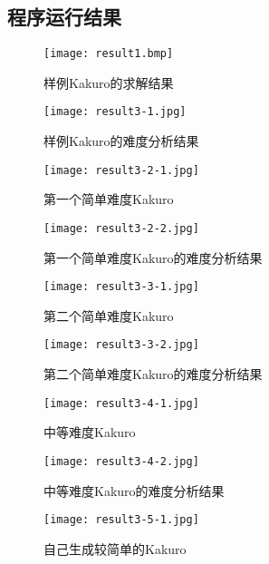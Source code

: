     \subsection*{程序运行结果}
        \begin{figure}[htb]
            \centering
            \texttt{[image: result1.bmp]}
            \caption[结果1]{样例Kakuro的求解结果}\label{resKak}
        \end{figure}
        \begin{figure}[htb]
            \centering
            \texttt{[image: result3-1.jpg]}
            \caption[结果3-1]{样例Kakuro的难度分析结果}\label{resDfc}
        \end{figure}
        \begin{figure}[htb]
            \centering
            \texttt{[image: result3-2-1.jpg]}
            \caption[数独3-2]{第一个简单难度Kakuro}
        \end{figure}
        \begin{figure}[htb]
            \centering
            \texttt{[image: result3-2-2.jpg]}
            \caption[结果3-2]{第一个简单难度Kakuro的难度分析结果}
        \end{figure}
        \begin{figure}[htb]
            \centering
            \texttt{[image: result3-3-1.jpg]}
            \caption[数独3-3]{第二个简单难度Kakuro}
        \end{figure}
        \begin{figure}[htb]
            \centering
            \texttt{[image: result3-3-2.jpg]}
            \caption[结果3-3]{第二个简单难度Kakuro的难度分析结果}
        \end{figure}
        \begin{figure}[htb]
            \centering
            \texttt{[image: result3-4-1.jpg]}
            \caption[数独3-4]{中等难度Kakuro}
        \end{figure}
        \begin{figure}[htb]
            \centering
            \texttt{[image: result3-4-2.jpg]}
            \caption[结果3-4]{中等难度Kakuro的难度分析结果}
        \end{figure}
        \begin{figure}[htb]
            \centering
            \texttt{[image: result3-5-1.jpg]}
            \caption[数独3-5]{自己生成较简单的Kakuro}
        \end{figure}
